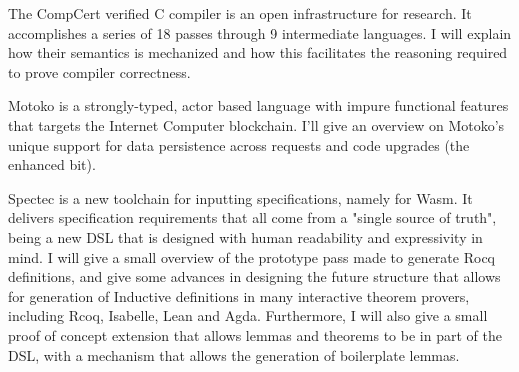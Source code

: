 \documentclass[a4paper,UKenglish]{dagrep-v2018}
\begin{document}
\license
{}

The CompCert verified C compiler is an open infrastructure for research. It accomplishes a series of 18 passes through 9 intermediate languages. I will explain how their semantics is mechanized and how this facilitates the reasoning required to prove compiler correctness.

\license
{}

Motoko is a strongly-typed, actor based language with impure functional features that targets the Internet Computer blockchain. I’ll give an overview on Motoko’s unique support for data persistence across requests and code upgrades (the enhanced bit).

\license

Spectec is a new toolchain for inputting specifications, namely for Wasm. It delivers specification requirements that all come from a "single source of truth", being a new DSL that is designed with human readability and expressivity in mind. I will give a small overview of the prototype pass made to generate Rocq definitions, and give some advances in designing the future structure that allows for generation of Inductive definitions in many interactive theorem provers, including Rcoq, Isabelle, Lean and Agda. Furthermore, I will also give a small proof of concept extension that allows lemmas and theorems to be in part of the DSL, with a mechanism that allows the generation of boilerplate lemmas.

\license
{}
\end{document}
